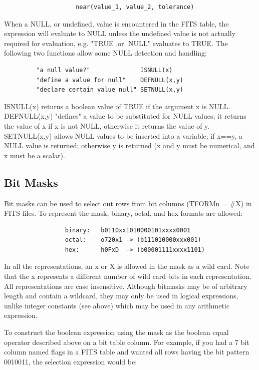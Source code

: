 \documentclass[11pt]{book}
\begin{document}
\begin{verbatim}
                    near(value_1, value_2, tolerance)
\end{verbatim}
    When  a  NULL, or undefined, value is encountered in the FITS table,
    the expression will evaluate to NULL unless the undefined  value  is
    not   actually   required  for  evaluation,  e.g. "TRUE  .or.  NULL"
    evaluates to TRUE. The  following  two  functions  allow  some  NULL
    detection  and  handling:

\begin{verbatim}
         "a null value?"              ISNULL(x)
         "define a value for null"    DEFNULL(x,y)
         "declare certain value null" SETNULL(x,y)
\end{verbatim}
    ISNULL(x)
    returns a boolean value of TRUE if the  argument  x  is  NULL. DEFNULL(x,y)
    "defines"  a  value  to  be  substituted  for NULL values; it
    returns the value of x if x is not NULL, otherwise  it  returns  the
    value of y.  SETNULL(x,y) allows NULL values to be inserted into
    a variable; if x==y, a NULL value is returned; otherwise y is returned
    (x and y must be numerical, and x must be a scalar).

\subsection{Bit Masks}

    Bit  masks can be used to select out rows from bit columns (TFORMn =
    \#X) in FITS files. To represent the mask,  binary,  octal,  and  hex
    formats are allowed:


\begin{verbatim}
                 binary:   b0110xx1010000101xxxx0001
                 octal:    o720x1 -> (b111010000xxx001)
                 hex:      h0FxD  -> (b00001111xxxx1101)
\end{verbatim}

    In  all  the  representations, an x or X is allowed in the mask as a
    wild card. Note that the x represents a  different  number  of  wild
    card  bits  in  each  representation.  All  representations are case
    insensitive.  Although bitmasks may be of arbitrary length and contain
    a wildcard, they may only be used in logical expressions, unlike 
    integer constants (see above) which may be used in any arithmetic
    expression.

    To construct the boolean expression using the mask  as  the  boolean
    equal  operator  described above on a bit table column. For example,
    if you had a 7 bit column named flags in a  FITS  table  and  wanted
    all  rows  having  the bit pattern 0010011, the selection expression
    would be:
\end{document}
